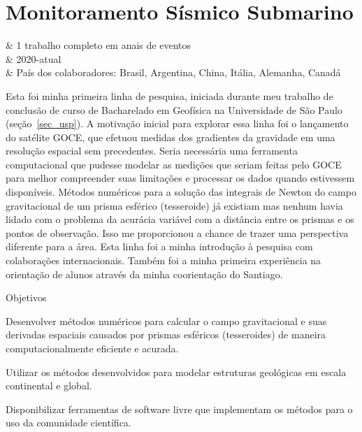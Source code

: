 \documentclass[10pt,a4paper,oneside]{book}
\begin{document}
\section{Monitoramento Sísmico Submarino}
\label{sec_monitor_sis}

\begin{summarybox}[frametitle=\faInfoCircle{}\quad Resumo da linha de pesquisa]
	\begin{fa-ul}
		\faBriefcase & 1 trabalho completo em anais de eventos \\
		\faBicycle & 2020-atual \\
		\faBullhorn & País dos colaboradores: Brasil, Argentina, China, Itália, Alemanha, Canadá
	\end{fa-ul}
\end{summarybox}

Esta foi minha primeira linha de pesquisa, iniciada durante meu trabalho de conclusão de curso de Bacharelado em Geofísica na Universidade de São Paulo
(seção~\ref{sec_usp}). A motivação inicial para explorar essa linha foi o lançamento do satélite GOCE, que efetuou medidas dos gradientes da gravidade em uma resolução espacial
sem precedentes. Seria necessária uma ferramenta computacional que pudesse modelar as medições que seriam feitas pelo GOCE para melhor compreender suas limitações e processar
os dados quando estivessem disponíveis. Métodos numéricos para a solução das integrais de Newton do campo gravitacional de um prisma esférico (tesseroide) já existiam
\citep{Heck2006,Asgharzadeh2007,WildPfeiffer2008} mas nenhum havia lidado com o problema da acurácia variável com a distância entre os prismas e os pontos de
observação. Isso me proporcionou a chance de trazer uma perspectiva diferente para a área. Esta linha foi a minha introdução à pesquisa com colaborações internacionais.
Também foi a minha primeira experiência na orientação de alunos através da minha coorientação do Santiago.

\begin{fancyenum}{\faBullseye}{Objetivos}
  \item Desenvolver métodos numéricos para calcular o campo gravitacional e suas derivadas espaciais causados por prismas esféricos (tesseroides) de maneira computacionalmente eficiente e acurada.
  \item Utilizar os métodos desenvolvidos para modelar estruturas geológicas em escala continental e global.
  \item Disponibilizar ferramentas de software livre que implementam os métodos para o uso da comunidade científica.
\end{fancyenum}
\end{document}

